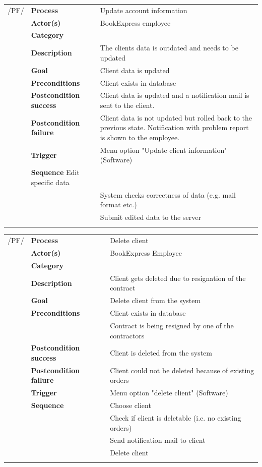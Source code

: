 \documentclass[11pt,a4paper,oneside,svgnames]{report}
\begin{document}
\noindent
\begin{tabular}{p{1.5cm}p{3cm}p{8cm}}
/PF/	& \textbf{Process} & Update account information\\
		& \textbf{Actor(s)} & BookExpress employee\\
		& \textbf{Category} & \\
		& \textbf{Description}	 & The clients data is outdated and needs to be updated\\
		& \textbf{Goal} & Client data is updated\\
		& \textbf{Preconditions} & Client exists in database\\
		& \textbf{Postcondition success} & Client data is updated and a notification mail is sent to the client.\\
		& \textbf{Postcondition failure} & Client data is not updated but rolled back to the previous state. Notification with problem report is shown to the employee.\\
		& \textbf{Trigger} & Menu option "Update client information" (Software)\\
		& \textbf{Sequence} Edit specific data\\
		& & System checks correctness of data (e.g. mail format etc.)\\
		& & Submit edited data to the server\\
\hfill \\
\end{tabular}

\noindent
\begin{tabular}{p{1.5cm}p{3cm}p{8cm}}
/PF/	& \textbf{Process} & Delete client\\ 
		& \textbf{Actor(s)} & BookExpress Employee\\ 
		& \textbf{Category} & \\
		& \textbf{Description}	 & Client gets deleted due to resignation of the contract\\ 
		& \textbf{Goal} & Delete client from the system\\
		& \textbf{Preconditions} & Client exists in database\\
		& & Contract is being resigned by one of the contractors\\
		& \textbf{Postcondition success} & Client is deleted from the system\\
		& \textbf{Postcondition failure} & Client could not be deleted because of existing orders\\
		& \textbf{Trigger} & Menu option "delete client" (Software)\\
		& \textbf{Sequence} & Choose client\\
		& & Check if client is deletable (i.e. no existing orders)\\
		& & Send notification mail to client\\
		& & Delete client\\
\hfill \\		
\end{tabular}
\end{document}
